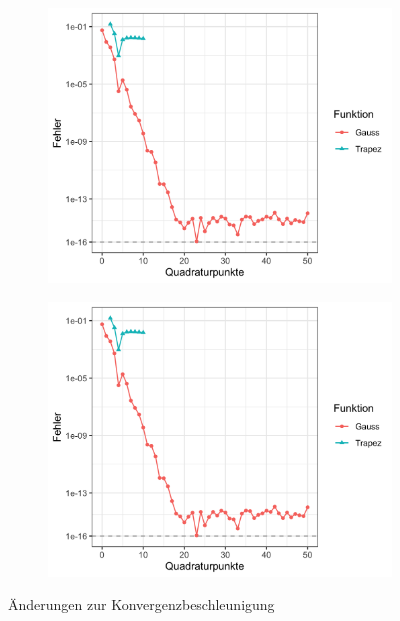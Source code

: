 \documentclass[12pt,a4paper]{scrartcl}
\numberwithin{equation}{section}
\numberwithin{myalgctr}{section}
\numberwithin{mytheoremctr}{section}
\numberwithin{mykorollarctr}{section}
\numberwithin{mylemmactr}{section}
\numberwithin{mybeispielctr}{section}
\begin{document}
	
	\begin{figure}[H]
		\begin{subfigure}[c]{0.5\textwidth}
			
			\includegraphics[width=\linewidth]{../plots/aufgabe-e2.png}
			\label{fig:gewichtsfunktionen-vergleich}
			
		\end{subfigure}
		\begin{subfigure}[c]{0.5\textwidth}
			\includegraphics[width=\linewidth]{../plots/aufgabe-e2.png}
			\label{fig:gauss-vs-besseretrapez}
		\end{subfigure}
	\caption{\"Anderungen zur Konvergenzbeschleunigung}
	\end{figure}
	
\end{document}
